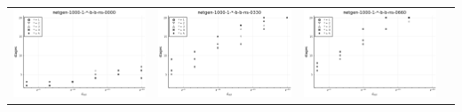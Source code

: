 \documentclass{article}
\begin{document}
\begin{landscape}
\begin{center}
\begin{longtable}{| c | c | c | c |}
                \hline
\includegraphics[height=0.22\textheight]{hiter_fixlim_netgen-1000-1-_-b-b-ns-0000.png} &
\includegraphics[height=0.22\textheight]{hiter_fixlim_netgen-1000-1-_-b-b-ns-0330.png} &
\includegraphics[height=0.22\textheight]{hiter_fixlim_netgen-1000-1-_-b-b-ns-0660.png} &

\end{longtable}
\end{center}
\end{landscape}
\end{document}
